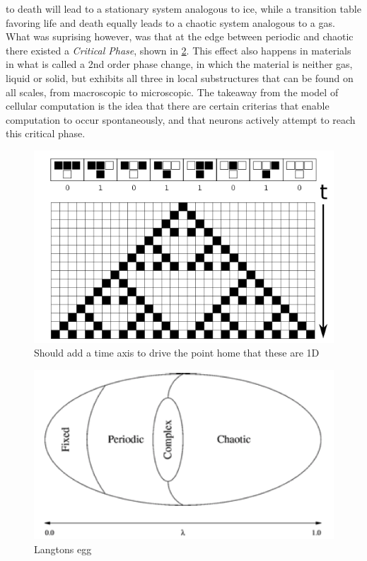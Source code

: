 to death will lead to a stationary system analogous to ice, while a transition
table favoring life and death equally leads to a chaotic system analogous to a
gas.
What was suprising however, was that at the edge between periodic and chaotic
there existed a \emph{Critical Phase}, shown in \ref{figCAegg}.
This effect also happens in materials in what is called a 2nd order phase
change, in which the material is neither gas, liquid or solid, but exhibits all
three in local substructures that can be found on all scales, from macroscopic
to microscopic.
The takeaway from the model of cellular computation is the idea that there are
certain criterias that enable computation to occur spontaneously, and that
neurons actively attempt to reach this critical phase.
\begin{figure}[h!]
  \centering
  \includegraphics[width=1\textwidth]{fig/ca22.png}
  \caption{Should add a time axis to drive the point home that these are 1D}
  \label{figCA22}
\end{figure}
\begin{figure}[h!]
  \centering
  \includegraphics[width=1\textwidth]{fig/Langtons_egg2.png}
  \caption{Langtons egg}
  \label{figCAegg}
\end{figure}


